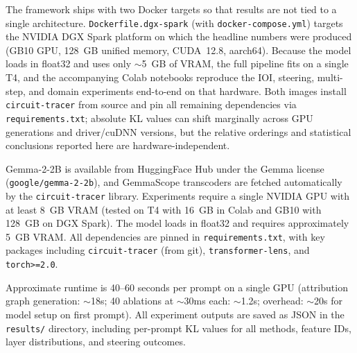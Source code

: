 The \ACD{} framework ships with two Docker targets so that results are not
tied to a single architecture.  \texttt{Dockerfile.dgx-spark} (with
\texttt{docker-compose.yml}) targets the NVIDIA DGX Spark platform on which
the headline numbers were produced (GB10 GPU, 128~GB unified memory,
CUDA~12.8, aarch64).    Because the model loads in
float32 and uses only $\sim$5~GB of VRAM, the full pipeline fits on a single
T4, and the accompanying Colab notebooks reproduce the IOI, steering,
multi-step, and domain experiments end-to-end on that hardware.  Both images
install \texttt{circuit-tracer} from source and pin all remaining
dependencies via \texttt{requirements.txt}; absolute KL values can shift
marginally across GPU generations and driver/cuDNN versions, but the
relative orderings and statistical conclusions reported here are
hardware-independent.

Gemma-2-2B is available from HuggingFace Hub under the Gemma license
(\texttt{google/\allowbreak gemma-2-2b}),
and GemmaScope transcoders are fetched automatically by the \texttt{circuit-tracer} library.
Experiments require a single NVIDIA GPU with at least 8~GB VRAM (tested on T4 with 16~GB in Colab
and GB10 with 128~GB on DGX Spark). The model loads in float32 and requires approximately 5~GB VRAM.
All dependencies are pinned in \texttt{requirements.txt}, with key packages including \texttt{circuit-tracer}
(from git), \texttt{transformer-lens}, and \texttt{torch>=2.0}.

Approximate runtime is 40--60 seconds per prompt on a single GPU (attribution graph generation: $\sim$18s;
40 ablations at $\sim$30ms each: $\sim$1.2s; overhead: $\sim$20s for model setup on first prompt).
All experiment outputs are saved as JSON in the \texttt{results/} directory, including per-prompt KL values
for all methods, feature IDs, layer distributions, and steering outcomes.
